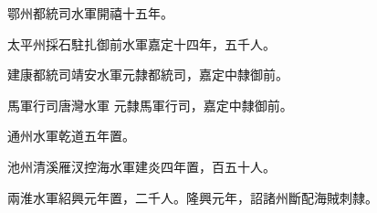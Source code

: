 \begin{pinyinscope}
 鄂州都統司水軍開禧十五年。



 太平州採石駐扎御前水軍嘉定十四年，五千人。



 建康都統司靖安水軍元隸都統司，嘉定中隸御前。



 馬軍行司唐灣水軍
 元隸馬軍行司，嘉定中隸御前。



 通州水軍乾道五年置。



 池州清溪雁汊控海水軍建炎四年置，百五十人。



 兩淮水軍紹興元年置，二千人。隆興元年，詔諸州斷配海賊刺隸。



\end{pinyinscope}